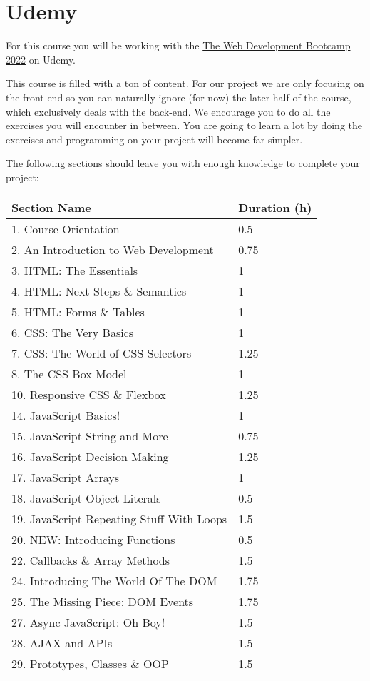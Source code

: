 \documentclass[
]{book}
\begin{document}
\hypertarget{udemy}{%
\section{Udemy}\label{udemy}}

For this course you will be working with the \href{https://www.udemy.com/course/the-web-developer-bootcamp/}{The Web Development Bootcamp 2022} on Udemy.

This course is filled with a ton of content. For our project we are only focusing on the front-end so you can naturally ignore (for now) the later half of the course, which exclusively deals with the back-end. We encourage you to do all the exercises you will encounter in between. You are going to learn a lot by doing the exercises and programming on your project will become far simpler.

The following sections should leave you with enough knowledge to complete your project:

\begin{longtable}[]{@{}ll@{}}
\toprule
Section Name & Duration (h) \\
\midrule
\endhead
1. Course Orientation & 0.5 \\
2. An Introduction to Web Development & 0.75 \\
3. HTML: The Essentials & 1 \\
4. HTML: Next Steps \& Semantics & 1 \\
5. HTML: Forms \& Tables & 1 \\
6. CSS: The Very Basics & 1 \\
7. CSS: The World of CSS Selectors & 1.25 \\
8. The CSS Box Model & 1 \\
10. Responsive CSS \& Flexbox & 1.25 \\
14. JavaScript Basics! & 1 \\
15. JavaScript String and More & 0.75 \\
16. JavaScript Decision Making & 1.25 \\
17. JavaScript Arrays & 1 \\
18. JavaScript Object Literals & 0.5 \\
19. JavaScript Repeating Stuff With Loops & 1.5 \\
20. NEW: Introducing Functions & 0.5 \\
22. Callbacks \& Array Methods & 1.5 \\
24. Introducing The World Of The DOM & 1.75 \\
25. The Missing Piece: DOM Events & 1.75 \\
27. Async JavaScript: Oh Boy! & 1.5 \\
28. AJAX and APIs & 1.5 \\
29. Prototypes, Classes \& OOP & 1.5 \\
\bottomrule
\end{longtable}
\end{document}

